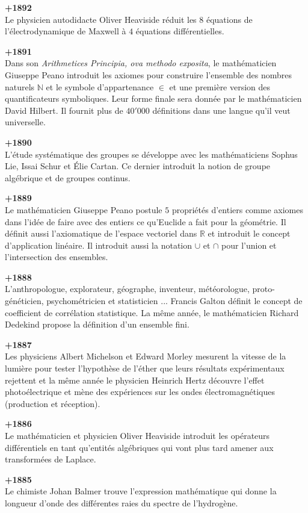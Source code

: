 \textbf{+1892}\\
Le physicien autodidacte Oliver Heaviside réduit les $8$ équations de l'électrodynamique de Maxwell à $4$ équations différentielles.

\textbf{+1891}\\
Dans son \textit{Arithmetices Principia, ova methodo exposita}, le mathématicien Giuseppe Peano introduit les axiomes pour construire l'ensemble des nombres naturels $\mathbb{N}$ et le symbole d'appartenance $\in$ et une première version des quantificateurs symboliques. Leur forme finale sera donnée par le mathématicien David Hilbert. Il fournit plus de $40'000$ définitions dans une langue qu'il veut universelle.

\textbf{+1890}\\
L'étude systématique des groupes se développe avec les mathématiciens Sophus Lie, Issai Schur et Élie Cartan. Ce dernier introduit la notion de groupe algébrique et de groupes continus.

\textbf{+1889}\\
Le mathématicien Giuseppe Peano postule $5$ propriétés d'entiers comme axiomes dans l'idée de faire avec des entiers ce qu'Euclide a fait pour la géométrie. Il définit aussi l'axiomatique de l'espace vectoriel dans $\mathbb{R}$ et introduit le concept d'application linéaire. Il introduit aussi la notation $\cup$ et $\cap$ pour l'union et l'intersection des ensembles.

\textbf{+1888}\\
L'anthropologue, explorateur, géographe, inventeur, météorologue, proto-généticien, psychométricien et statisticien ... Francis Galton définit le concept de coefficient de corrélation statistique. La même année, le mathématicien Richard Dedekind propose la définition d'un ensemble fini.

\textbf{+1887}\\
Les physiciens Albert Michelson et Edward Morley mesurent la vitesse de la lumière pour tester l'hypothèse de l'éther que leurs résultats expérimentaux rejettent et la même année le physicien Heinrich Hertz découvre l'effet photoélectrique et mène des expériences sur les ondes électromagnétiques (production et réception).

\textbf{+1886}\\
Le mathématicien et physicien Oliver Heaviside introduit les opérateurs différentiels en tant qu'entités algébriques qui vont plus tard amener aux transformées de Laplace.

\textbf{+1885}\\
Le chimiste Johan Balmer trouve l'expression mathématique qui donne la longueur d'onde des différentes raies du spectre de l'hydrogène.


